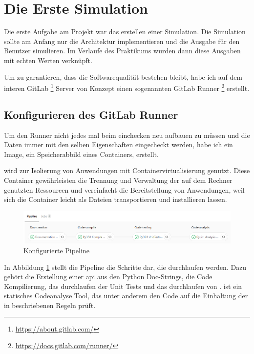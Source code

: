 \section{Die Erste Simulation}
\label{sec:first_simulation}

Die erste Aufgabe am Projekt war das erstellen einer Simulation. Die Simulation sollte am 
Anfang nur die Architektur implementieren und die Ausgabe für den Benutzer simulieren. Im 
Verlaufe des Praktikums wurden dann diese Ausgaben mit echten Werten verknüpft.

Um zu garantieren, dass die Softwarequalität bestehen bleibt, habe ich auf dem interen GitLab
\footnote{\url{https://about.gitlab.com/}} Server von Konzept einen sogenannten GitLab Runner
\footnote{\url{https://docs.gitlab.com/runner/}} erstellt. 


\subsection{Konfigurieren des GitLab Runner}
\label{subsec:gitlab_runner}

Um den Runner nicht jedes mal beim einchecken neu aufbauen zu müssen und die Daten immer mit 
den selben Eigenschaften eingecheckt werden, habe ich ein \cite{Docker} Image, ein Speicherabbild eines Containers, erstellt.

\cite{Docker} wird zur Isolierung von Anwendungen mit Containervirtualisierung genutzt. Diese 
Container gewährleisten die Trennung und Verwaltung der auf dem Rechner genutzten Ressourcen 
und vereinfacht die Bereitstellung von Anwendungen, weil sich die Container leicht als Dateien 
transportieren und installieren lassen.

\begin{figure}[H]
	\centering
	\includegraphics[width=1\textwidth, height=0.25\textwidth]{graphics/pipeline.png}
	\caption{Konfigurierte Pipeline}
	\label{fig:pipeline}
\end{figure}

In Abbildung \ref{fig:pipeline} stellt die Pipeline die Schritte dar, die durchlaufen werden.
Dazu gehört die Erstellung einer \ac{api} aus den Python Doc-Strings, die Code Kompilierung, das durchlaufen der Unit Tests und das durchlaufen von \cite{Pylint}. \cite{Pylint} ist ein statisches Codeanalyse Tool, das unter anderem den Code auf die Einhaltung der in \cite{PEP8} beschriebenen Regeln prüft.


